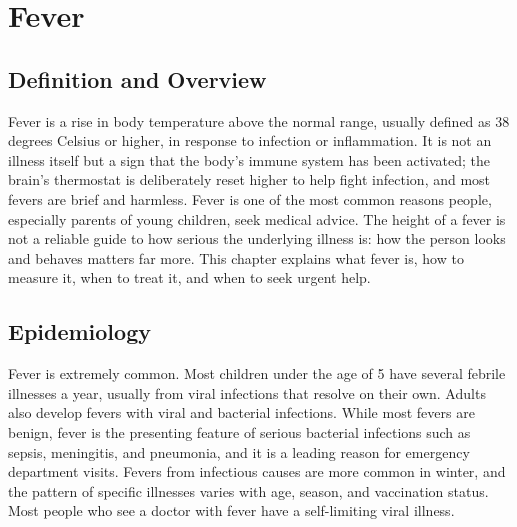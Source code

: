 \chapter{Fever}

\section*{Definition and Overview}
Fever is a rise in body temperature above the normal range, usually defined as 38 degrees Celsius or higher, in response to infection or inflammation. It is not an illness itself but a sign that the body's immune system has been activated; the brain's thermostat is deliberately reset higher to help fight infection, and most fevers are brief and harmless. Fever is one of the most common reasons people, especially parents of young children, seek medical advice. The height of a fever is not a reliable guide to how serious the underlying illness is: how the person looks and behaves matters far more. This chapter explains what fever is, how to measure it, when to treat it, and when to seek urgent help.

\section*{Epidemiology}
Fever is extremely common. Most children under the age of 5 have several febrile illnesses a year, usually from viral infections that resolve on their own. Adults also develop fevers with viral and bacterial infections. While most fevers are benign, fever is the presenting feature of serious bacterial infections such as sepsis, meningitis, and pneumonia, and it is a leading reason for emergency department visits. Fevers from infectious causes are more common in winter, and the pattern of specific illnesses varies with age, season, and vaccination status. Most people who see a doctor with fever have a self-limiting viral illness.

